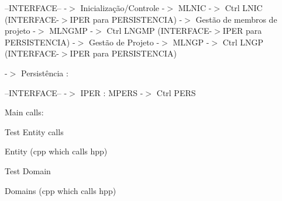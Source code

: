 --I\+N\+T\+E\+R\+F\+A\+CE-- -\/$>$ Inicialização/\+Controle -\/$>$ M\+L\+N\+IC -\/$>$ Ctrl L\+N\+IC (I\+N\+T\+E\+R\+F\+A\+C\+E-\/$>$I\+P\+ER para P\+E\+R\+S\+I\+S\+T\+E\+N\+C\+IA) -\/$>$ Gestão de membros de projeto -\/$>$ M\+L\+N\+G\+MP -\/$>$ Ctrl L\+N\+G\+MP (I\+N\+T\+E\+R\+F\+A\+C\+E-\/$>$I\+P\+ER para P\+E\+R\+S\+I\+S\+T\+E\+N\+C\+IA) -\/$>$ Gestão de Projeto -\/$>$ M\+L\+N\+GP -\/$>$ Ctrl L\+N\+GP (I\+N\+T\+E\+R\+F\+A\+C\+E-\/$>$I\+P\+ER para P\+E\+R\+S\+I\+S\+T\+E\+N\+C\+IA)

-\/$>$ Persistência \+:

--I\+N\+T\+E\+R\+F\+A\+CE-- -\/$>$ I\+P\+ER \+: M\+P\+E\+RS -\/$>$ Ctrl P\+E\+RS

Main calls\+:
\begin{DoxyItemize}
\item Test Entity calls
\begin{DoxyItemize}
\item Entity (cpp which calls hpp)
\end{DoxyItemize}
\item Test Domain
\begin{DoxyItemize}
\item Domains (cpp which calls hpp) 
\end{DoxyItemize}
\end{DoxyItemize}